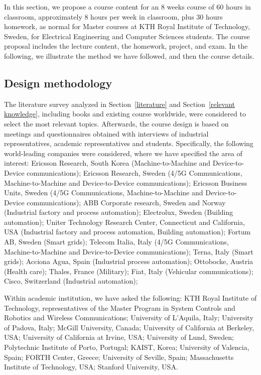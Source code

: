 \documentclass[onecolumn,12pt,draftclsnofoot,a4paper,peerreview]{IEEEtran}
\begin{document}
In this section, we propose a course content for an 8 weeks course of 60 hours in classroom, approximately 8 hours per week in classroom, plus 30 hours homework, as normal for Master courses at KTH Royal Institute of Technology, Sweden, for Electrical Engineering and Computer Sciences students. The course proposal includes the lecture content, the homework, project, and exam. In the following, we illustrate the method we have followed, and then the course details. 

\subsection{Design methodology}

The literature survey analyzed in Section~\ref{literature} and Section~\ref{relevant knowledge}, including books and existing course worldwide, were considered to select the most relevant topics. Afterwards, the course design is based on meetings and questionnaires obtained with interviews of industrial representatives, academic representatives and students. Specifically, the following world-leading companies were considered, where we have specified the area of interest:
Ericsson Research, South Korea (Machine-to-Machine and Device-to-Device communications); Ericsson Research, Sweden (4/5G Communications, Machine-to-Machine and Device-to-Device communications); Ericsson Business Units, Sweden (4/5G Communications, Machine-to-Machine and Device-to-Device communications);
ABB Corporate research, Sweden and Norway (Industrial factory and process automation); Electrolux, Sweden (Building automation); Uniter Technology Research Center, Connecticut and California, USA (Industrial factory and process automation, Building automation); Fortum AB, Sweden (Smart grids); Telecom Italia, Italy (4/5G Communications, Machine-to-Machine and Device-to-Device communications); Terna, Italy (Smart grids); Acciona Agua, Spain (Industrial process automation);
Ottobocke, Austria (Health care); Thales, France (Military); Fiat, Italy (Vehicular communications); Cisco, Switzerland (Industrial automation);


Within academic institution, we have asked the following: KTH Royal Institute of Technology, representatives of the Master Program in System Controls and Robotics and Wireless Communications; University of L'Aquila, Italy; University of Padova, Italy; McGill University, Canada; University of California at Berkeley, USA; 
University of California at Irvine, USA; University of Lund, Sweden; Polytechnic Institute of Porto, Portugal; KAIST, Korea; University of Valencia, Spain; FORTH Center, Greece; University of Seville, Spain; Massachusetts Institute of Technology, USA; Stanford University, USA.
 
\end{document}
